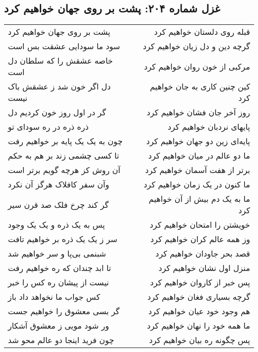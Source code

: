 \begin{center}
\section*{غزل شماره ۲۰۴: پشت بر روی جهان خواهیم کرد}
\label{sec:204}
\begin{longtable}{l p{0.5cm} r}
پشت بر روی جهان خواهیم کرد
&&
قبله روی دلستان خواهیم کرد
\\
سود ما سودایی عشقت بس است
&&
گرچه دین و دل زیان خواهیم کرد
\\
خاصه عشقش را که سلطان دل است
&&
مرکبی از خون روان خواهیم کرد
\\
دل اگر خون شد ز عشقش باک نیست
&&
کین چنین کاری به جان خواهیم کرد
\\
گر در اول روز خون کردیم دل
&&
روز آخر جان فشان خواهیم کرد
\\
ذره ذره در ره سودای تو
&&
پایهای نردبان خواهیم کرد
\\
چون به یک یک پایه بر خواهیم رفت
&&
پایه‌ای زین دو جهان خواهیم کرد
\\
تا کسی چشمی زند بر هم به حکم
&&
ما دو عالم در میان خواهیم کرد
\\
آن روش کز هرچه گویم برتر است
&&
برتر از هفت آسمان خواهیم کرد
\\
وآن سفر کافلاک هرگز آن نکرد
&&
ما کنون در یک زمان خواهیم کرد
\\
گر کند چرخ فلک صد قرن سیر
&&
ما به یک دم بیش از آن خواهیم کرد
\\
پس به یک ذره و یک یک وجود
&&
خویشتن را امتحان خواهیم کرد
\\
سر ز یک یک ذره بر خواهیم تافت
&&
وز همه عالم کران خواهیم کرد
\\
شبنمی بی‌پا و سر خواهیم شد
&&
قصد بحر جاودان خواهیم کرد
\\
تا ابد چندان که ره خواهیم رفت
&&
منزل اول نشان خواهیم کرد
\\
نیست از پیشان ره کس را خبر
&&
پس خبر از کاروان خواهیم کرد
\\
کس جواب ما نخواهد داد باز
&&
گرچه بسیاری فغان خواهیم کرد
\\
گر بسی معشوق را خواهیم جست
&&
هم وجود خود عیان خواهیم کرد
\\
ور شود مویی ز معشوق آشکار
&&
ما همه خود را نهان خواهیم کرد
\\
چون فرید اینجا دو عالم محو شد
&&
پس چگونه ره بیان خواهیم کرد
\\
\end{longtable}
\end{center}
